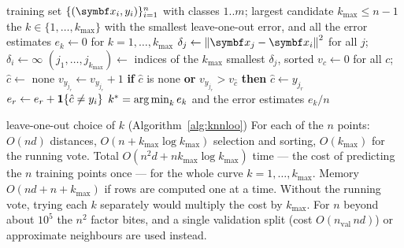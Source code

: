 \documentclass[11pt]{article}
\begin{document}
\begin{algorithm}[htbp]
\caption{Leave-one-out choice of $k$ for $k$-NN classification}
\label{alg:knnloo}
\begin{algorithmic}[1]
\Require training set $\{(\x_i, y_i)\}_{i=1}^n$ with classes $1..m$; largest candidate $k_{\max} \le n - 1$
\Ensure the $k \in \{1, \dots, k_{\max}\}$ with the smallest leave-one-out error, and all the error estimates
\State $e_k \gets 0$ for $k = 1, \dots, k_{\max}$
  \State $\delta_j \gets \norm{\x_j - \x_i}^2$ for all $j$; \ $\delta_i \gets \infty$ 
  \State $(j_1, \dots, j_{k_{\max}}) \gets$ indices of the $k_{\max}$ smallest $\delta_j$, sorted
  \State $v_c \gets 0$ for all $c$; \ $\hat c \gets$ none
   
    \State $v_{y_{j_r}} \gets v_{y_{j_r}} + 1$
    \State \textbf{if} $\hat c$ is none \textbf{or} $v_{y_{j_r}} > v_{\hat c}$ \textbf{then} $\hat c \gets y_{j_r}$
    \State $e_r \gets e_r + \mathbf{1}\!\left\{\hat c \ne y_i\right\}$
  \EndFor
\EndFor
\State \Return $k^* = \operatorname*{arg\,min}_k e_k$ and the error estimates $e_k / n$
\end{algorithmic}
\end{algorithm}

\begin{runtime}{leave-one-out choice of $k$ (Algorithm~\ref{alg:knnloo})}
For each of the $n$ points: $O(nd)$ distances, $O(n + k_{\max} \log k_{\max})$ selection and sorting, $O(k_{\max})$
for the running vote. Total $O(n^2 d + nk_{\max}\log k_{\max})$ time --- the cost of predicting the $n$ training points
once --- for the whole curve $k = 1, \dots, k_{\max}$. Memory $O(nd + n + k_{\max})$ if rows are computed one at a
time. Without the running vote, trying each $k$ separately would multiply the cost by $k_{\max}$. For $n$ beyond about $10^5$ the $n^2$ factor bites, and a single
validation split (cost $O(n_{\mathrm{val}}\, n d)$) or approximate neighbours are used instead.
\end{runtime}
\end{document}
